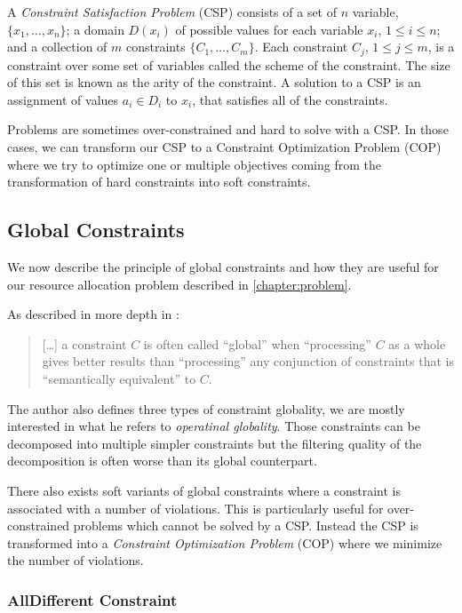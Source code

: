 \documentclass[../../thesis.tex]{subfiles}
\begin{document}
A \emph{Constraint Satisfaction Problem} (CSP) consists of a set of $n$ variable, 
$\{x_1, \dots, x_n \}$; a domain $D(x_i)$ of possible values for each variable $x_i$, 
$1 \leq i \leq n$; and a collection of $m$ constraints $\{ C_1, \dots, C_m \}$. 
Each constraint $C_j$, $1 \leq j \leq m$, is a constraint over some set of variables called the scheme 
of the constraint. The size of this set is known as the arity of the constraint. 
A solution to a CSP is an assignment of values $a_i \in D_i$ to $x_i$, that satisfies all of the constraints. \cite{cp-definition}

Problems are sometimes over-constrained and hard to solve with a CSP. In those cases, we can transform our 
CSP to a Constraint Optimization Problem (COP) where we try to optimize one or multiple objectives coming 
from the transformation of hard constraints into soft constraints.

\subsection{Global Constraints}


We now describe the principle of global constraints and how they are useful for our resource allocation problem 
described in \autoref{chapter:problem}.

As described in more depth in \cite{Hentenryck:2003}:

\begin{quotation}
  [\dots] a constraint $C$ is often called “global” when “processing” $C$ as a whole gives better results than “processing” any conjunction
  of constraints that is “semantically equivalent” to $C$.
\end{quotation}

The author also defines three types of constraint globality, we are mostly interested in what he refers to \emph{operatinal globality}. 
Those constraints can be decomposed into multiple simpler constraints but the filtering quality of the decomposition
is often worse than its global counterpart. 

There also exists soft variants \cite{Regin:2000} of global constraints where a constraint is associated with 
a number of violations. This is particularly useful for over-constrained problems which cannot be solved by a CSP.
Instead the CSP is transformed into a \emph{Constraint Optimization Problem} (COP) where we minimize the number of violations.
\subsubsection{AllDifferent Constraint}
\label{sota:alldifferent}
\end{document}
